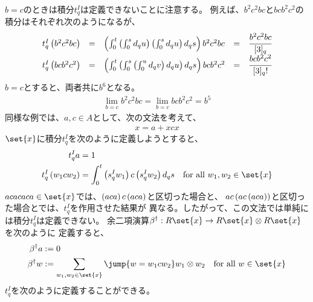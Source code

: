 {	\begin{todo}[文法の曖昧さと積分]\label{todo:文法の曖昧さと積分} %
		$b=c$のときは積分$t_q^I$は定義できないことに注意する。
		例えば、$b^2c^2bc$と$bcb^2c^2$の積分はそれぞれ次のようになるが、
		\begin{equation*}\begin{array}{rclcl}
			t_q^I\left({b^2c^2bc}\right)
			&=& \left({\int_0^t\left({\int_0^sd_qu}\right)\left({\int_0^sd_qu}\right)d_qs}\right) b^2c^2bc
			&=& \cfrac{b^2c^2bc}{[3]_q} \\
			t_q^I\left({bcb^2c^2}\right) 
			&=& \left({\int_0^t\left({\int_0^s\left({\int_0^ud_qv}\right)d_qu}\right)d_qs}\right) bcb^2c^2
			&=& \cfrac{bcb^2c^2}{[3]_q!} \\
		\end{array}\end{equation*}
		$b=c$とすると、両者共に$b^6$となる。
		\begin{equation*}\begin{split}
			\lim_{b=c} b^2c^2bc = \lim_{b=c} bcb^2c^2 = b^5
		\end{split}\end{equation*}
		同様な例では、$a,c\in A$として、次の文法を考えて、
		\begin{equation*}\begin{split}
			x = a + xcx
		\end{split}\end{equation*}
		$\set{x}$に積分$t_q^I$を次のように定義しようとすると、
		\begin{equation*}\begin{split}
			t_q^Ia &= 1 \\
			t_q^I\lr{w_1cw_2} &= \int_0^t\lr{s_q^Iw_1}c\lr{s_q^Iw_2}d_qs
			\quad\text{for all } w_1,w_2\in \set{x}
		\end{split}\end{equation*}
		$acacaca\in\set{x}$では、$\left({aca}\right)c\left({aca}\right)$と区切った場合と、
		$ac\left({ac\left({aca}\right)}\right)$と区切った場合とでは、$t_q^I$を作用させた結果が
		異なる。したがって、この文法では単純には積分$t_q^I$は定義できない。
		余二項演算$\beta^\dag:R\set{x}\to R\set{x}\otimes R\set{x}$を次のように
		定義すると、
		\begin{equation*}\begin{split}
			\beta^\dag a &:= 0 \\
			\beta^\dag w &:= \sum_{w_1,w_2\in\set{x}} \jump{w = w_1cw_2}
				w_1\otimes w_2 \quad\text{for all } w\in\set{x}
		\end{split}\end{equation*}
		$t_q^I$を次のように定義することができる。
		\begin{equation*}\begin{split}

\end{split}
\end{equation*}
\end{todo}}

